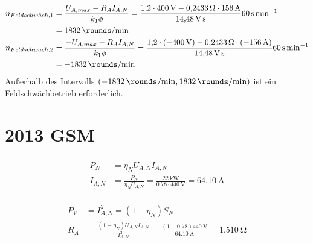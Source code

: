 \documentclass[11pt,a4paper]{scrartcl}
\newcommand{\mybr}[1]{\left(#1\right)}
\newcommand{\0}{_{\mybr{0}}}
\newcommand{\1}{_{\mybr{1}}}
\newcommand{\2}{_{\mybr{2}}}
\begin{document}
\subsection{}
\begin{align}
n_{Feldschw\ddot{a}ch,1}&=\frac{U_{A,max}-R_A I_{A,N}}{k_1\phi}=\frac{\num{1.2}\cdot\SI{400}{\volt}-\SI{0.2433}{\ohm}\cdot\SI{156}{\ampere}}{\SI{14.48}{\volt\second}}\SI{60}{\second\per\minute}\\
&=\SI{1832}{\rounds\per\minute}\\
n_{Feldschw\ddot{a}ch,2}&=\frac{-U_{A,max}-R_A I_{A,N}}{k_1\phi}=\frac{\num{1.2}\cdot\mybr{\SI{-400}{\volt}}-\SI{0.2433}{\ohm}\cdot\mybr{\SI{-156}{\ampere}}}{\SI{14.48}{\volt\second}}\SI{60}{\second\per\minute}\\
&=\SI{-1832}{\rounds\per\minute}
\end{align}
Außerhalb des Intervalls $\mybr{\SI{-1832}{\rounds\per\minute},\SI{1832}{\rounds\per\minute}}$ ist ein Feldschwächbetrieb erforderlich.

\clearpage
\part{2013 GSM}
\section{}
\subsection{}
\begin{align}
P_N&=\eta_N U_{A,N} I_{A,N}\\
I_{A,N}&=\frac{P_N}{\eta_N U_{A,N}}=\frac{\SI{22}{\kilo\watt}}{\num{0.78}\cdot\SI{440}{\volt}}=\SI{64.10}{\ampere}
\end{align}

\subsection{}
\begin{align}
P_V&=I_{A,N}^2=\mybr{1-\eta_N}S_N\\
R_A&=\frac{\mybr{1-\eta_N} U_{A,N} I_{A,N}}{I_{A,N}^2}=\frac{\mybr{1-\num{0.78}}\SI{440}{\volt}}{\SI{64.10}{\ampere}}=\SI{1.510}{\ohm}
\end{align}
\end{document}
